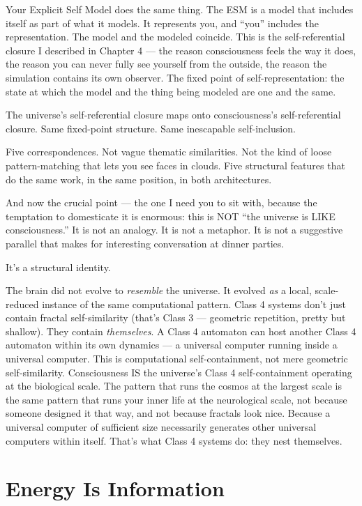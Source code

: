 \documentclass[11pt, twoside, openright]{book}
\begin{document}
Your Explicit Self Model does the same thing. The ESM is a model that includes itself as part of what it models. It represents you, and ``you'' includes the representation. The model and the modeled coincide. This is the self-referential closure I described in Chapter 4 --- the reason consciousness feels the way it does, the reason you can never fully see yourself from the outside, the reason the simulation contains its own observer. The fixed point of self-representation: the state at which the model and the thing being modeled are one and the same.

The universe's self-referential closure maps onto consciousness's self-referential closure. Same fixed-point structure. Same inescapable self-inclusion.

Five correspondences. Not vague thematic similarities. Not the kind of loose pattern-matching that lets you see faces in clouds. Five structural features that do the same work, in the same position, in both architectures.

And now the crucial point --- the one I need you to sit with, because the temptation to domesticate it is enormous: this is NOT ``the universe is LIKE consciousness.'' It is not an analogy. It is not a metaphor. It is not a suggestive parallel that makes for interesting conversation at dinner parties.

It's a structural identity.

The brain did not evolve to \textit{resemble} the universe. It evolved \textit{as} a local, scale-reduced instance of the same computational pattern. Class 4 systems don't just contain fractal self-similarity (that's Class 3 --- geometric repetition, pretty but shallow). They contain \textit{themselves}. A Class 4 automaton can host another Class 4 automaton within its own dynamics --- a universal computer running inside a universal computer. This is computational self-containment, not mere geometric self-similarity. Consciousness IS the universe's Class 4 self-containment operating at the biological scale. The pattern that runs the cosmos at the largest scale is the same pattern that runs your inner life at the neurological scale, not because someone designed it that way, and not because fractals look nice. Because a universal computer of sufficient size necessarily generates other universal computers within itself. That's what Class 4 systems do: they nest themselves.

\section*{Energy Is Information}
\end{document}
